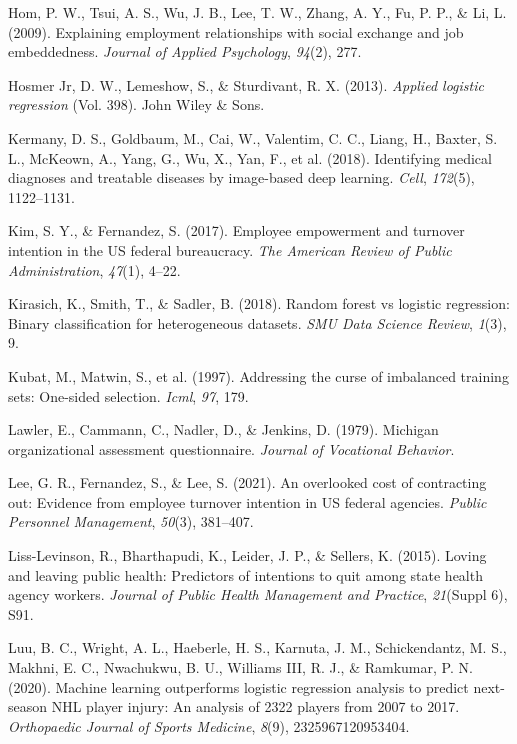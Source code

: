 \documentclass[
  man]{apa7}
\newlength{\cslhangindent}
\newenvironment{CSLReferences}[2] %
 {\begin{list}{}{%
  \setlength{\itemindent}{0pt}
  \setlength{\leftmargin}{0pt}
  \setlength{\parsep}{0pt}
  \ifodd #1
   \setlength{\leftmargin}{\cslhangindent}
   \setlength{\itemindent}{-1\cslhangindent}
  \fi
  \setlength{\itemsep}{#2\baselineskip}}}
 {\end{list}}
\begin{document}
\begin{CSLReferences}{1}{0}
Hom, P. W., Tsui, A. S., Wu, J. B., Lee, T. W., Zhang, A. Y., Fu, P. P., \& Li, L. (2009). Explaining employment relationships with social exchange and job embeddedness. \emph{Journal of Applied Psychology}, \emph{94}(2), 277.

Hosmer Jr, D. W., Lemeshow, S., \& Sturdivant, R. X. (2013). \emph{Applied logistic regression} (Vol. 398). John Wiley \& Sons.

Kermany, D. S., Goldbaum, M., Cai, W., Valentim, C. C., Liang, H., Baxter, S. L., McKeown, A., Yang, G., Wu, X., Yan, F., et al. (2018). Identifying medical diagnoses and treatable diseases by image-based deep learning. \emph{Cell}, \emph{172}(5), 1122--1131.

Kim, S. Y., \& Fernandez, S. (2017). Employee empowerment and turnover intention in the US federal bureaucracy. \emph{The American Review of Public Administration}, \emph{47}(1), 4--22.

Kirasich, K., Smith, T., \& Sadler, B. (2018). Random forest vs logistic regression: Binary classification for heterogeneous datasets. \emph{SMU Data Science Review}, \emph{1}(3), 9.

Kubat, M., Matwin, S., et al. (1997). Addressing the curse of imbalanced training sets: One-sided selection. \emph{Icml}, \emph{97}, 179.

Lawler, E., Cammann, C., Nadler, D., \& Jenkins, D. (1979). Michigan organizational assessment questionnaire. \emph{Journal of Vocational Behavior}.

Lee, G. R., Fernandez, S., \& Lee, S. (2021). An overlooked cost of contracting out: Evidence from employee turnover intention in US federal agencies. \emph{Public Personnel Management}, \emph{50}(3), 381--407.

Liss-Levinson, R., Bharthapudi, K., Leider, J. P., \& Sellers, K. (2015). Loving and leaving public health: Predictors of intentions to quit among state health agency workers. \emph{Journal of Public Health Management and Practice}, \emph{21}(Suppl 6), S91.

Luu, B. C., Wright, A. L., Haeberle, H. S., Karnuta, J. M., Schickendantz, M. S., Makhni, E. C., Nwachukwu, B. U., Williams III, R. J., \& Ramkumar, P. N. (2020). Machine learning outperforms logistic regression analysis to predict next-season NHL player injury: An analysis of 2322 players from 2007 to 2017. \emph{Orthopaedic Journal of Sports Medicine}, \emph{8}(9), 2325967120953404.


\end{CSLReferences}
\end{document}
